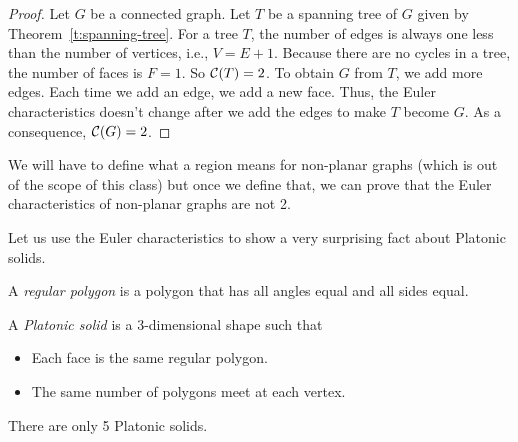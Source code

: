 \begin{proof}
    Let $G$ be a connected graph.
    Let $T$ be a spanning tree of $G$ given by Theorem~\ref{t:spanning-tree}.
    For a tree $T$, the number of edges is always one less than the number of vertices, i.e., $V = E + 1$. Because there are no cycles in a tree, the number of faces is $F = 1$.
    So $\mathcal{C}(T) = 2$. To obtain $G$ from $T$, 
    we add more edges. Each time we add an edge, we add a new face. Thus, the Euler characteristics doesn't change after we add the edges to make $T$ become $G$.
    As a consequence, $\mathcal{C}(G) = 2$.
\end{proof}


We will have to define what a region means for non-planar graphs (which is out
of the scope of this class) but once we define that, 
we can prove that the Euler characteristics of non-planar graphs are not 2.



Let us use the Euler characteristics to show a very surprising fact about
Platonic solids.

\begin{definition}
   A \emph{regular polygon} is a polygon that has all angles equal and all sides equal. 
\end{definition}

\begin{definition}
   A  \emph{Platonic solid} is a 3-dimensional shape such that
   \begin{itemize}
       \item Each face is the same regular polygon.
       \item The same number of polygons meet at each vertex.
   \end{itemize}
\end{definition}

\begin{theorem}
   There are only 5 Platonic solids. 
\end{theorem}

